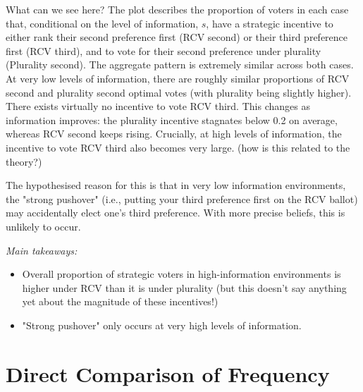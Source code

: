 \documentclass[11pt, letter, margin = 2 in]{article}
\begin{document}
What can we see here? The plot describes the proportion of voters in each case that, conditional on the level of information, $s$, have a strategic incentive to either rank their second preference first (RCV second) or their third preference first (RCV third), and to vote for their second preference under plurality (Plurality second).
The aggregate pattern is extremely similar across both cases. At very low levels of information, there are roughly similar proportions of RCV second and plurality second optimal votes (with plurality being slightly higher). There exists virtually no incentive to vote RCV third. This changes as information improves: the plurality incentive stagnates below 0.2 on average, whereas RCV second keeps rising. Crucially, at high levels of information, the incentive to vote RCV third also becomes very large. (how is this related to the theory?)

The hypothesised reason for this is that in very low information environments, the "strong pushover" (i.e., putting your third preference first on the RCV ballot) may accidentally elect one's third preference. With more precise beliefs, this is unlikely to occur.

\textit{Main takeaways:}
\begin{itemize}
\item Overall proportion of strategic voters in high-information environments is higher under RCV than it is under plurality (but this doesn't say anything yet about the magnitude of these incentives!)
\item "Strong pushover" only occurs at very high levels of information.
\end{itemize}

\section{Direct Comparison of Frequency}
\end{document}
